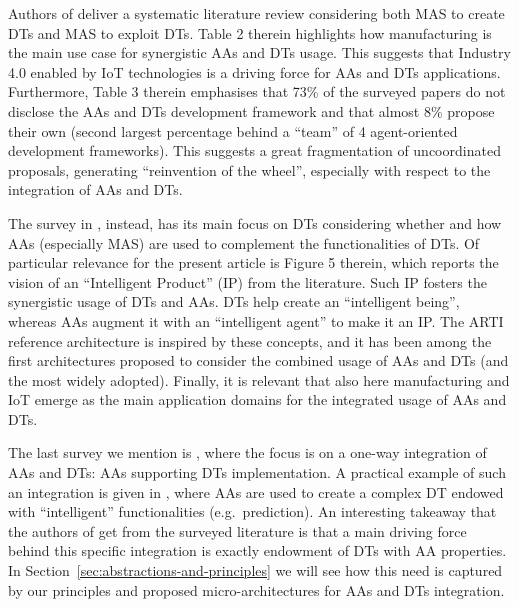 Authors of \cite{Pretel2024} deliver a systematic literature review considering both MAS to create DTs and MAS to exploit DTs. 
Table 2 therein highlights how manufacturing is the main use case for synergistic AAs and DTs usage. 
This suggests that Industry 4.0 enabled by IoT technologies is a driving force for AAs and DTs applications. 
Furthermore, Table 3 therein emphasises that 73\% of the surveyed papers do not disclose the AAs and DTs development framework 
and that almost 8\% propose their own 
    (second largest percentage behind a ``team'' of 4 agent-oriented development frameworks). 
This suggests a great fragmentation of uncoordinated proposals, 
generating ``reinvention of the wheel'', especially with respect to the integration of AAs and DTs.

The survey in \cite{10.1115/1.4050244}, instead, has its main focus on DTs considering whether and how AAs (especially MAS) are used to complement the functionalities of DTs. 
Of particular relevance for the present article is Figure 5 therein, 
which reports the vision of an ``Intelligent Product'' (IP) from the literature. 
Such IP fosters the synergistic usage of DTs and AAs. 
DTs help create an ``intelligent being'', 
whereas AAs augment it with an ``intelligent agent'' to make it an IP. 
The ARTI reference architecture is inspired by these concepts, 
and it has been among the first architectures proposed to consider 
the combined usage of AAs and DTs (and the most widely adopted). 
Finally, it is relevant that also here manufacturing and IoT emerge as the main application domains for the integrated usage of AAs and DTs.

The last survey we mention is \cite{Kalyani2025}, 
where the focus is on a one-way integration of AAs and DTs: 
AAs supporting DTs implementation. 
A practical example of such an integration is given in \cite{Latsou2021811}, 
where AAs are used to create a complex DT endowed with ``intelligent'' functionalities (e.g.\ prediction). 
An interesting takeaway that the authors of \cite{Kalyani2025} get from the surveyed literature 
is that a main driving force behind this specific integration is exactly endowment of DTs with AA properties. 
In Section~\ref{sec:abstractions-and-principles} we will see how this need is captured by our principles and proposed micro-architectures for AAs and DTs integration.

